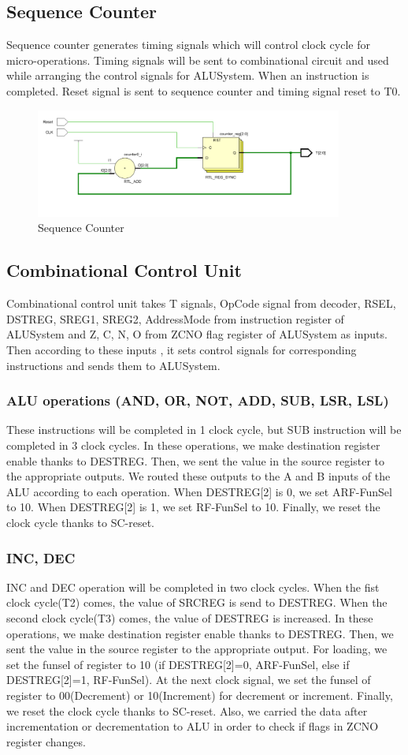 \documentclass[pdftex,12pt,a4paper]{article}
\begin{document}
\subsection{Sequence Counter}
Sequence counter generates timing signals which will control clock cycle for micro-operations. Timing signals will be sent to combinational circuit and used while arranging the control signals for ALUSystem. When an instruction is completed. Reset signal is sent to sequence counter and timing signal reset to T0.
\begin{figure}[ht]
	\centering
	\includegraphics[width=0.9\textwidth]{sequence_counter.png}	
	\caption{Sequence Counter}
	\label{fig1}
\end{figure}
\subsection{Combinational Control Unit}
Combinational control unit takes T signals, OpCode signal from decoder, RSEL, DSTREG, SREG1, SREG2, AddressMode from instruction register of ALUSystem and Z, C, N, O from ZCNO flag register of ALUSystem as inputs. Then according to these inputs , it sets control signals for corresponding instructions and sends them to ALUSystem. 
\subsubsection{ALU operations (AND, OR, NOT, ADD, SUB, LSR, LSL)}
These instructions will be completed in 1 clock cycle, but SUB instruction will be completed in 3 clock cycles. In these operations, we make destination register enable thanks to DESTREG. Then, we sent the value in the source register to the appropriate outputs. We routed these outputs to the A and B inputs of the ALU according to each operation. When DESTREG[2] is 0, we set ARF-FunSel to 10. When DESTREG[2] is 1, we set RF-FunSel to 10. Finally, we reset the clock cycle thanks to SC-reset.
\subsubsection{INC, DEC}
INC and DEC operation will be completed in two clock cycles. When the fist clock cycle(T2) comes, the value of SRCREG is send to DESTREG. When the second clock cycle(T3) comes, the value of DESTREG is increased. In these operations, we make destination register enable thanks to DESTREG. Then, we sent the value in the source register to the appropriate output. For loading, we set the funsel of register to 10 (if DESTREG[2]=0, ARF-FunSel, else if DESTREG[2]=1, RF-FunSel). At the next clock signal, we set the funsel of register to 00(Decrement) or 10(Increment) for decrement or increment. Finally, we reset the clock cycle thanks to SC-reset. Also, we carried the data after incrementation or decrementation to ALU in order to check if flags in ZCNO register changes.
\end{document}
